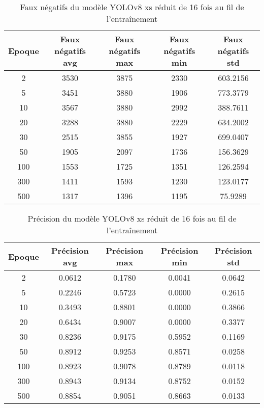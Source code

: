 \begin{table}[!ht]
    \caption{Faux négatifs du modèle YOLOv8 xs réduit de 16 fois au fil de l'entraînement}
    \label{tab:yolov8xs_reduced16x_false_negative}
    \centering
    \begin{tabular}{ |c||c|c|c|c|  }
        \hline
        \rowcolor{gray!50}
        Epoque & Faux négatifs avg & Faux négatifs max & Faux négatifs min & Faux négatifs std\\
        \hline
        2 & 3530 & 3875 & 2330 & 603.2156\\
        5 & 3451 & 3880 & 1906 & 773.3779\\
        10 & 3567 & 3880 & 2992 & 388.7611\\
        20 & 3288 & 3880 & 2229 & 634.2002\\
        30 & 2515 & 3855 & 1927 & 699.0407\\
        50 & 1905 & 2097 & 1736 & 156.3629\\
        100 & 1553 & 1725 & 1351 & 126.2594\\
        300 & 1411 & 1593 & 1230 & 123.0177\\
        500 & 1317 & 1396 & 1195 & 75.9289\\
        \hline
    \end{tabular}
\end{table}

\begin{table}[!ht]
    \caption{Précision du modèle YOLOv8 xs réduit de 16 fois au fil de l'entraînement}
    \label{tab:yolov8xs_reduced16x_precision}
    \centering
    \begin{tabular}{ |c||c|c|c|c|  }
        \hline
        \rowcolor{gray!50}
        Epoque & Précision avg & Précision max & Précision min & Précision std\\
        \hline
        2 & 0.0612 & 0.1780 & 0.0041 & 0.0642\\
        5 & 0.2246 & 0.5723 & 0.0000 & 0.2615\\
        10 & 0.3493 & 0.8801 & 0.0000 & 0.3866\\
        20 & 0.6434 & 0.9007 & 0.0000 & 0.3377\\
        30 & 0.8236 & 0.9175 & 0.5952 & 0.1169\\
        50 & 0.8912 & 0.9253 & 0.8571 & 0.0258\\
        100 & 0.8923 & 0.9078 & 0.8789 & 0.0118\\
        300 & 0.8943 & 0.9134 & 0.8752 & 0.0152\\
        500 & 0.8854 & 0.9051 & 0.8663 & 0.0133\\
        \hline
    \end{tabular}
\end{table}


